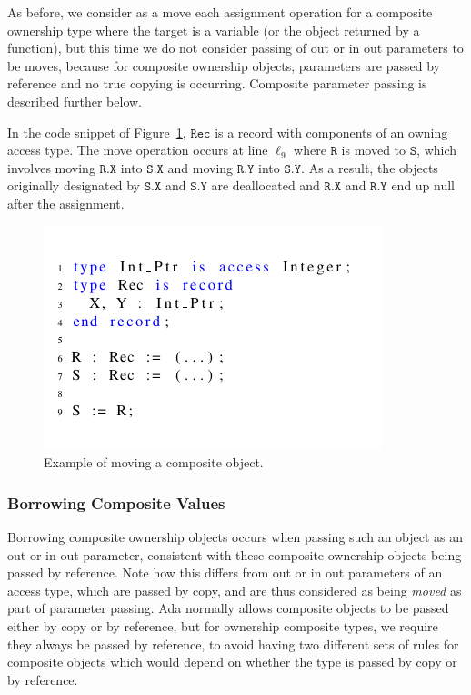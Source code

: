 \documentclass{llncs}
\newcommand\var[1]{\ensuremath{\mathtt{#1}}}
\newcommand{\keyword}[1]{\textsf{#1}}
\begin{document}
As before, we consider as a move each assignment operation for a composite ownership type where the target is a variable (or the object returned by a function), but this time we do not
consider passing of \keyword{out} or \keyword{in out} parameters to be moves, because for composite ownership objects, parameters are passed by reference and no true copying is occurring. Composite parameter passing is described further below.

In the code snippet of Figure~\ref{fig:movingComposite}, \var{Rec} is a record with components of an owning access type. The move operation occurs at line $\ell_{9}$ where \var{R} is moved
to \var{S}, which involves moving \var{R.X} into \var{S.X} and moving \var{R.Y} into \var{S.Y}. As a result, the objects originally designated by
\var{S.X} and \var{S.Y} are deallocated and \var{R.X} and \var{R.Y} end up null after the assignment.


\begin{figure}[htb!]
\centering
   \includegraphics[]{movingComposite}
   \caption{Example of moving a composite object.}
   \label{fig:movingComposite}
\end{figure}

\subsubsection{Borrowing Composite Values}
\label{subsubsec:borrowComposite}

Borrowing composite ownership objects occurs when passing such an object as an \keyword{out} or \keyword{in out} parameter, consistent with
these composite ownership objects being passed by reference. Note how this differs from \keyword{out} or \keyword{in out} parameters of an access type, which are passed by copy,
and are thus considered as being \textit{moved} as part of parameter passing. Ada normally allows composite objects to be passed either by copy or by reference, but for ownership composite types, we require they always be passed by reference, to avoid having two different sets of rules for composite objects which would depend on whether the type is passed by copy or by reference.
\end{document}
